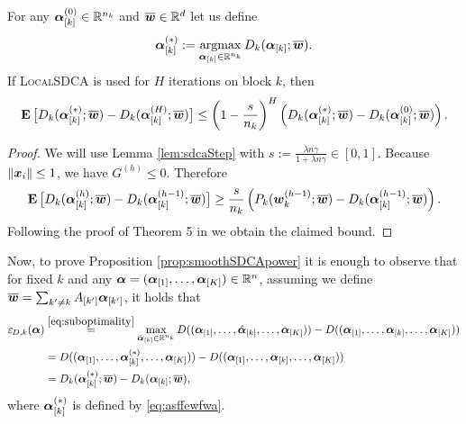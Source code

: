 \documentclass{article} %
\newcommand{\localSDCA}{\textsc{LocalSDCA}\xspace}
\begin{document}
\begin{lemma}
For any $\bm{\alpha}_{[k]}^{(0)} \in \mathbb{R}^{n_k}$
and $\overline{{\bm{w}}} \in \mathbb{R}^d$
let us define
\begin{equation}\label{eq:asffewfwa}
\bm{\alpha}_{[k]}^{(*)}
:= \operatorname*{argmax}_{\bm{\alpha}_{[k]} \in \mathbb{R}^{n_k}} D_k(\bm{\alpha}_{[k]}; \overline{{\bm{w}}}).
\end{equation}
If \localSDCA is used for $H$ iterations on block $k$, then
\begin{equation}
\label{eq:asfavfwavfwavg}
\operatorname*{\mathbf{E}}\big[ D_k (  \bm{\alpha}_{[k]}^{(*)}; \overline{{\bm{w}}})
 -
 D_k (  \bm{\alpha}_{[k]}^{(H)}; \overline{{\bm{w}}}) \big]
 \leq \left(1-\frac{s}{n_k}\right)^H
 \left(
 D_k (  \bm{\alpha}_{[k]}^{(*)}; \overline{{\bm{w}}})
 -
 D_k (  \bm{\alpha}_{[k]}^{(0)}; \overline{{\bm{w}}})
 \right).
\end{equation}
\end{lemma}
\begin{proof}
We will use Lemma \ref{lem:sdcaStep} with
$s := \frac{\lambda n \gamma}{1+\lambda n \gamma} \in [0,1]$.
Because $\|\bm{x}_i\|\leq 1$, we have $G^{(h)}\leq 0$. Therefore
\begin{equation}
\operatorname*{\mathbf{E}}\big[ D_k (  \bm{\alpha}_{[k]}^{(h)}; \overline{{\bm{w}}})
 -
 D_k (  \bm{\alpha}_{[k]}^{(h-1)}; \overline{{\bm{w}}}) \big]
 \geq \frac{s}{n_k}
\left(P_k (  {\bm{w}}_k^{(h-1)}; \overline{{\bm{w}}})
 -
  D_k (  \bm{\alpha}_{[k]}^{(h-1)}; \overline{{\bm{w}}}) \right).
\end{equation}
Following the proof of Theorem 5 in \cite{ShalevShwartz:2013wl}
we obtain the claimed bound.
\end{proof}

 
Now, to prove Proposition \ref{prop:smoothSDCApower} 
it is enough to observe that
for fixed $k$ 
and any $\bm{\alpha} = (\bm{\alpha}_{[1]},\dots,\bm{\alpha}_{[K]}) \in \mathbb{R}^n$,
assuming we define $\overline{{\bm{w}}}= \sum_{k'\ne k} A_{[k']}\bm{\alpha}_{[k']}$, it holds that
\begin{align*}
{\varepsilon}_{\hspace{-0.08em}D,k}(\bm{\alpha})
&\overset{\eqref{eq:suboptimality}}{=}
\max_{\hat {\bm{\alpha}}_{[k]} \in \mathbb{R}^{n_k}} 
D((\bm{\alpha}_{[1]},\dots,\hat {\bm{\alpha}}_{[k]},\dots,\bm{\alpha}_{[K]})) - D((\bm{\alpha}_{[1]},\dots,\bm{\alpha}_{[k]},\dots,\bm{\alpha}_{[K]}))
\\
&=
D((\bm{\alpha}_{[1]},\dots,\bm{\alpha}_{[k]}^{(*)},\dots,\bm{\alpha}_{[K]})) - D((\bm{\alpha}_{[1]},\dots,\bm{\alpha}_{[k]},\dots,\bm{\alpha}_{[K]}))
\\
&=
 D_k (  \bm{\alpha}_{[k]}^{(*)}; \overline{{\bm{w}}})
 -
 D_k (  \bm{\alpha}_{[k]}; \overline{{\bm{w}}}),
\end{align*}
 where $\bm{\alpha}_{[k]}^{(*)}$
 is defined by \eqref{eq:asffewfwa}.
 

%
\end{document}
